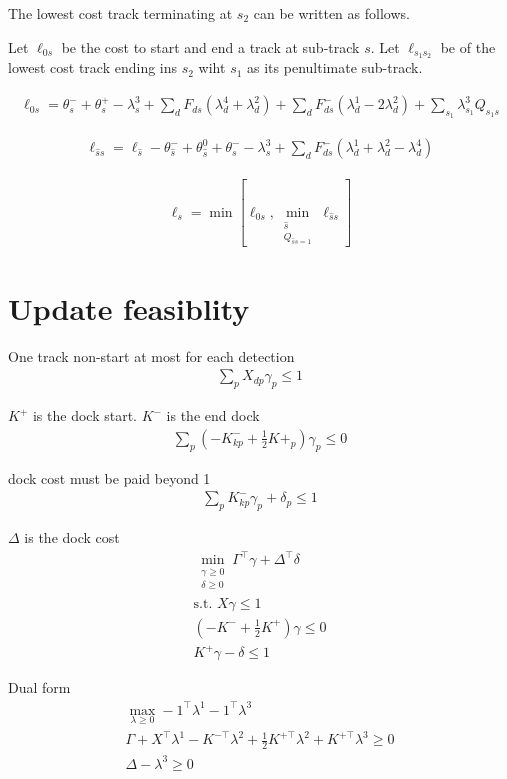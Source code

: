 \documentclass{article}
\begin{document}
The lowest cost track terminating at $s_2$ can be written as follows.  

Let $\ell_{0s}$ be the cost to start and end a track at sub-track $s$.  Let $\ell_{s_1s_2}$ be of the lowest cost track ending ins $s_2$ wiht $s_1$ as its penultimate sub-track.  

\begin{align}
\ell_{0s}=\theta^-_s+\theta^+_s-\lambda^3_s+\sum_{d}F_{ds}(\lambda^4_d+\lambda^2_d)+\sum_{d}F^-_{ds}(\lambda^1_d-2\lambda^2_d)+ \sum_{s_1} \lambda^3_{s_1}Q_{s_1s}
\end{align}

\begin{align}
\ell_{\hat{s}s}=\ell_{\hat{s}}-\theta^-_{\hat{s}}+\theta^0_{\hat{s}}+\theta^-_s-\lambda^3_s+\sum_{d}F^-_{ds}(\lambda^1_d+\lambda^2_d-\lambda^4_d) %
\end{align}

\begin{align}
\ell_s=\min [\ell_{0s},\min_{\substack{\hat{s} \\ Q_{\hat{s}s=1}}}\ell_{\hat{s}s}]
\end{align}

\section{Update feasiblity}

One track non-start at most for each detection
\begin{align}
\sum_{p} X_{dp}\gamma_p \leq 1
\end{align}

$K^+$ is the dock start.  $K^-$ is the end dock
\begin{align}
\sum_{p}(-K^-_{kp}+\frac{1}{2}K+_p)\gamma_p \leq 0
\end{align}

dock cost must be paid beyond 1
\begin{align}
\sum_{p}K^-_{kp}\gamma_p+\delta_p \leq 1
\end{align}

$\Delta$ is the dock cost
\begin{align}
\min_{\substack{\gamma \geq 0 \\ \delta \geq 0}}\Gamma^{\top}\gamma + \Delta^{\top}\delta\\
\nonumber \mbox{s.t.   } X\gamma \leq 1\\
\nonumber (-K^-+\frac{1}{2}K^+)\gamma \leq 0\\
\nonumber K^{+}\gamma-\delta \leq 1
\end{align}

Dual form
\begin{align}
\max_{\lambda \geq 0}-1^{\top }\lambda^1-1^{\top}\lambda^{3}\\
\nonumber \Gamma+X^{\top}\lambda^1-K^{-\top}\lambda^2+\frac{1}{2}K^{+\top}\lambda^2 +K^{+\top}\lambda^3\geq 0\\
\nonumber \Delta -\lambda^3 \geq 0
\end{align}



\end{document}
